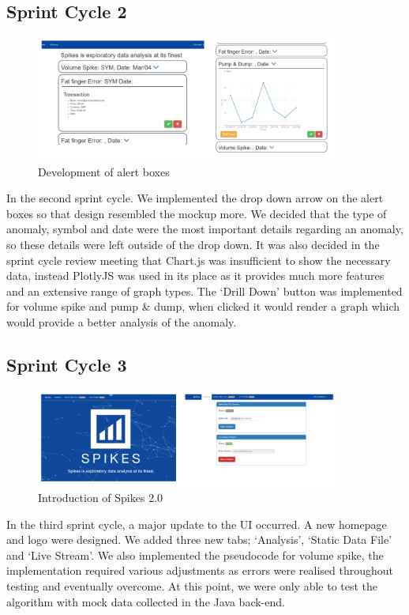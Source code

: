 \documentclass[12pt]{article}
\begin{document}
  \subsection{Sprint Cycle 2}
  \begin{figure}[H]
  \centering
  \includegraphics[width=100mm]{sprint2.png}
  \caption{Development of alert boxes}
  \end{figure}
  In the second sprint cycle. We implemented the drop down arrow on the alert boxes so that design resembled the mockup more. We decided that the type of anomaly, symbol and date were the most important details regarding an anomaly, so these details were left outside of the drop down.
  It was also decided in the sprint cycle review meeting that Chart.js was insufficient to show the necessary data, instead PlotlyJS was used in its place as it provides much more features and an extensive range of graph types.
  The ‘Drill Down’ button was implemented for volume spike and pump \& dump, when clicked it would render a graph which would provide a better analysis of the anomaly.
  \subsection{Sprint Cycle 3}
  \begin{figure}[H]
  \centering
  \includegraphics[width=100mm]{sprint3.png}
  \caption{Introduction of Spikes 2.0}
  \end{figure}
  In the third sprint cycle, a major update to the UI occurred. A new homepage and logo were designed.
  We added three new tabs; ‘Analysis’, ‘Static Data File’ and ‘Live Stream’.
  We also implemented the pseudocode for volume spike, the implementation required various adjustments
  as errors were realised throughout testing and eventually overcome.
  At this point, we were only able to test the algorithm with mock data collected in the Java back-end.
\end{document}
